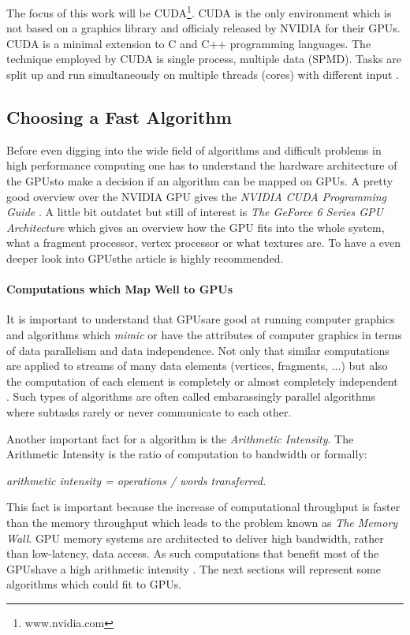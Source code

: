 The focus of this work will be CUDA\footnote{www.nvidia.com}. \gls{CUDA} is the only
environment which is not based on a graphics library and officialy released by
NVIDIA for their GPUs. \gls{CUDA} is a minimal extension to C and C++ programming
languages. The technique employed by \gls{CUDA} is single process, multiple data
(SPMD). Tasks are split up and run simultaneously on multiple threads (cores)
with different input \citep{citeulike:3072519}.

\subsection*{Choosing a Fast Algorithm} %
\label{ssub:choosing_a_fast_algorithm}
Before even digging into the wide field of algorithms and difficult problems in
high performance computing one has to understand the hardware architecture of
the \glspl{GPU}to make a decision if an algorithm can be mapped on GPUs. A pretty good
overview over the NVIDIA \gls{GPU} gives the \emph{NVIDIA \gls{CUDA} Programming Guide}
\citep{citeulike:3325943}. A little bit outdatet but still of interest is
\emph{The GeForce 6 Series \gls{GPU} Architecture}\citep{citeulike:3757915} which gives
an overview how the \gls{GPU} fits into the whole system, what a fragment processor,
vertex processor or what textures are. To have a even deeper look into \glspl{GPU}the
article \citep{citeulike:2790995} is highly recommended.

\paragraph{Computations which Map Well to GPUs} %
\label{par:computations_which_map_well_to_GPUs}
It is important to understand that \glspl{GPU}are good at running computer graphics
and algorithms which \emph{mimic} or have the attributes of computer graphics in
terms of data parallelism and data independence. Not only that similar
computations are applied to streams of many data elements (vertices, fragments,
...) but also the computation of each element is completely or almost completely
independent \citep{citeulike:3733428}. Such types of algorithms are often called
embarassingly parallel algorithms where subtasks rarely or never communicate to
each other.

Another important fact for a algorithm is the \emph{Arithmetic Intensity}. The
Arithmetic Intensity is the ratio of computation to bandwidth or formally:
\begin{center} 
 \emph{arithmetic intensity = operations / words transferred.}
\end{center}
This fact is important because the increase of computational throughput is
faster than the memory throughput which leads to the problem known as \emph{The
Memory Wall}. \gls{GPU} memory systems are architected to deliver high bandwidth,
rather than low-latency, data access. As such computations that benefit most of
the \glspl{GPU}have a high arithmetic intensity \citep{citeulike:3733428}. The next 
sections will represent some algorithms which could fit to GPUs. 

